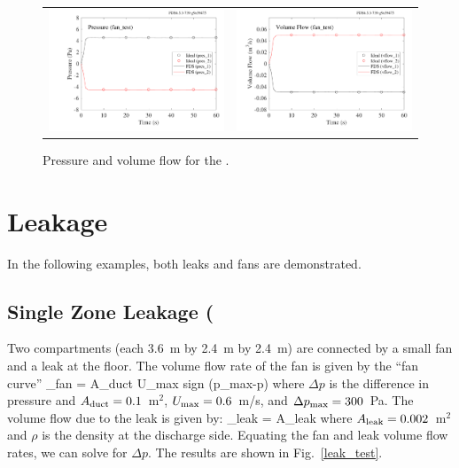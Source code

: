 \documentclass[11pt]{book}
\begin{document}
\begin{figure}[ht]
\begin{tabular*}{\textwidth}{lr}
\includegraphics[width=3.1in]{SCRIPT_FIGURES/fan_test_Pressure} &
\includegraphics[width=3.1in]{SCRIPT_FIGURES/fan_test_Volume_Flow}
\end{tabular*}
\caption[Results of the  case]{Pressure and volume flow for the .}
\label{fan_test}
\end{figure}

\clearpage

\section{Leakage}

In the following examples, both leaks and fans are demonstrated.

\subsection{Single Zone Leakage (\texorpdfstring{})}
\label{single_zone_leak}

Two compartments (each 3.6~m by 2.4~m by 2.4~m) are connected by a small fan and a leak at the floor. The volume flow rate of the fan is given by the ``fan curve''
\be
  _{\hbox{\footnotesize fan}} = A_{\hbox{\footnotesize duct}}
  U_{\hbox{\footnotesize max}} \;
   \hbox{sign} (\Delta p_{\hbox{\footnotesize max}}-\Delta p)
\ee
where $\Delta p$ is the difference in pressure and $A_{\hbox{\scriptsize duct}}=0.1$~m$^2$, $U_{\hbox{\scriptsize max}}=0.6$~m/s, and $\Delta p_{\hbox{\scriptsize max}}=300$~Pa. The volume flow due to the leak is given by:
\be
   _{\hbox{\scriptsize leak}} = A_{\hbox{\scriptsize leak}} 
\ee
where $A_{\hbox{\scriptsize leak}}=0.002$~m$^2$ and $\rho$ is the density at the discharge side. Equating the fan and leak volume flow rates, we can solve for $\Delta p$. The results are shown in Fig.~\ref{leak_test}.
\end{document}
